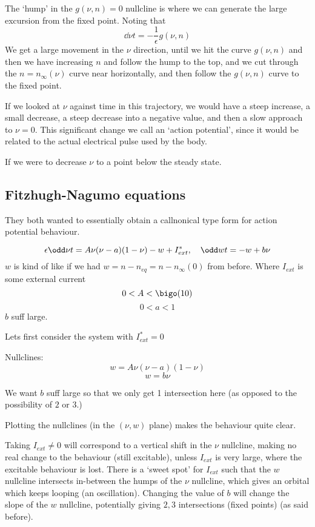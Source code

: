 \documentclass{X:/Documents/Coding/Latex/myassignment}
\begin{document}
The `hump' in the $g(\nu,n) = 0$ nullcline is where we can generate the large excursion from the fixed point. 
Noting that 
\[\dd \nu t = -\frac1 \epsilon g(\nu,n)\]
We get a large movement in the $\nu$ direction, until we hit the curve $g(\nu,n)$ and then we have increasing $n$ and follow the hump to the top, and we cut through the $n=n_{\infty}(\nu)$ curve near horizontally, and then follow the $g(\nu,n)$ curve to the fixed point.

If we looked at $\nu$ against time in this trajectory, we would have a steep increase, a small decrease, a steep decrease into a negative value, and then a slow approach to $\nu=0$.
This significant change we call an `action potential', since it would be related to the actual electrical pulse used by the body.


If we were to decrease $\nu$ to a point below the steady state.


\subsection{Fitzhugh-Nagumo equations}
They both wanted to essentially obtain a callnonical type form for action potential behaviour.

\[\epsilon \odd \nu t = A \nu (\nu - a) (1 - \nu) - w + I_{ext}^* , \quad \odd wt = -w + b \nu\]
$w$ is kind of like if we had $w = n - n_{eq} = n- n_{\infty}(0)$ from before.
Where $I_{ext}$ is some external current
\[0 < A < \bigo(10)\]
\[0 < a < 1\]
$b$ suff large.

Lets first consider the system with $I_{ext}^* = 0$

Nullclines:
\[w = A \nu (\nu -a ) (1- \nu)\]
\[w = b \nu\]

We want $b$ suff large so that we only get 1 intersection here (as opposed to the possibility of $2$ or $3$.)

Plotting the nullclines (in the $(\nu,w)$ plane) makes the behaviour quite clear.

Taking $I_{ext} \neq 0$ will correspond to a vertical shift in the $\nu$ nullcline, making no real change to the behaviour (still excitable), unless $I_{ext}$ is very large, where the excitable behaviour is lost. There is a `sweet spot' for $I_{ext}$ such that the $w$ nullcline intersects in-between the humps of the $\nu$ nullcline, which gives an orbital which keeps looping (an oscillation).
Changing the value of $b$ will change the slope of the $w$ nullcline, potentially giving $2,3$ intersections (fixed points) (as said before).
\end{document}
